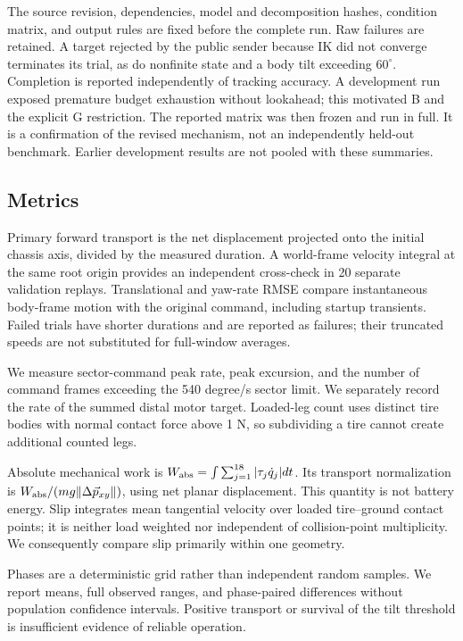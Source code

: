 \documentclass[letterpaper,10pt,conference]{ieeeconf}
\newcommand{\vct}[1]{\vec{#1}}
\begin{document}
The source revision, dependencies, model and decomposition hashes, condition matrix, and output rules are fixed before the complete run. Raw failures are retained. A target rejected by the public sender because IK did not converge terminates its trial, as do nonfinite state and a body tilt exceeding $60^\circ$. Completion is reported independently of tracking accuracy. A development run exposed premature budget exhaustion without lookahead; this motivated B and the explicit G restriction. The reported matrix was then frozen and run in full. It is a confirmation of the revised mechanism, not an independently held-out benchmark. Earlier development results are not pooled with these summaries.

\subsection{Metrics}
Primary forward transport is the net displacement projected onto the initial chassis axis, divided by the measured duration. A world-frame velocity integral at the same root origin provides an independent cross-check in 20 separate validation replays. Translational and yaw-rate RMSE compare instantaneous body-frame motion with the original command, including startup transients. Failed trials have shorter durations and are reported as failures; their truncated speeds are not substituted for full-window averages.

We measure sector-command peak rate, peak excursion, and the number of command frames exceeding the 540 degree/s sector limit. We separately record the rate of the summed distal motor target. Loaded-leg count uses distinct tire bodies with normal contact force above 1 N, so subdividing a tire cannot create additional counted legs.

Absolute mechanical work is $W_{\rm abs}=\int\sum_{j=1}^{18}|\tau_j\dot q_j|dt$. Its transport normalization is $W_{\rm abs}/(mg\|\Delta\vct{p}_{xy}\|)$, using net planar displacement. This quantity is not battery energy. Slip integrates mean tangential velocity over loaded tire--ground contact points; it is neither load weighted nor independent of collision-point multiplicity. We consequently compare slip primarily within one geometry.

Phases are a deterministic grid rather than independent random samples. We report means, full observed ranges, and phase-paired differences without population confidence intervals. Positive transport or survival of the tilt threshold is insufficient evidence of reliable operation.
\end{document}
